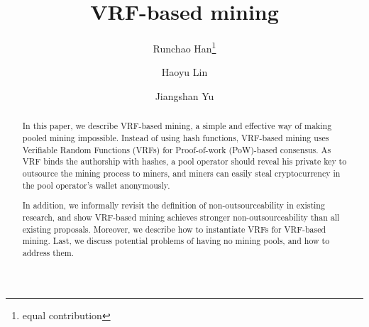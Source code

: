\documentclass[runningheads]{llncs}
\makeatletter
\newcommand{\printfnsymbol}[1]{%
  \textsuperscript{\@fnsymbol{#1}}%
}
\makeatother
\begin{document}
\title{VRF-based mining}

\author{
    Runchao Han\thanks{equal contribution}
    \and Haoyu Lin\printfnsymbol{1}
    \and Jiangshan Yu
}


\maketitle

\begin{abstract}
  In this paper, we describe VRF-based mining, a simple and effective way of making pooled mining impossible.
  Instead of using hash functions, VRF-based mining uses Verifiable Random Functions (VRFs) for Proof-of-work (PoW)-based consensus.
  As VRF binds the authorship with hashes, a pool operator should reveal his private key to outsource the mining process to miners, and miners can easily steal cryptocurrency in the pool operator's wallet anonymously.
  
  In addition, we informally revisit the definition of non-outsourceability in existing research, and show VRF-based mining achieves stronger non-outsourceability than all existing proposals.
  Moreover, we describe how to instantiate VRFs for VRF-based mining.
  Last, we discuss potential problems of having no mining pools, and how to address them.
\end{abstract}















\appendix

\end{document}
